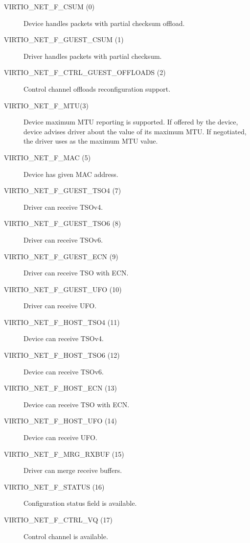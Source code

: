 \begin{description}
\item[VIRTIO_NET_F_CSUM (0)] Device handles packets with partial checksum offload.

\item[VIRTIO_NET_F_GUEST_CSUM (1)] Driver handles packets with partial checksum.

\item[VIRTIO_NET_F_CTRL_GUEST_OFFLOADS (2)] Control channel offloads
        reconfiguration support.

\item[VIRTIO_NET_F_MTU(3)] Device maximum MTU reporting is supported. If
    offered by the device, device advises driver about the value of
    its maximum MTU. If negotiated, the driver uses  as
    the maximum MTU value.

\item[VIRTIO_NET_F_MAC (5)] Device has given MAC address.

\item[VIRTIO_NET_F_GUEST_TSO4 (7)] Driver can receive TSOv4.

\item[VIRTIO_NET_F_GUEST_TSO6 (8)] Driver can receive TSOv6.

\item[VIRTIO_NET_F_GUEST_ECN (9)] Driver can receive TSO with ECN.

\item[VIRTIO_NET_F_GUEST_UFO (10)] Driver can receive UFO.

\item[VIRTIO_NET_F_HOST_TSO4 (11)] Device can receive TSOv4.

\item[VIRTIO_NET_F_HOST_TSO6 (12)] Device can receive TSOv6.

\item[VIRTIO_NET_F_HOST_ECN (13)] Device can receive TSO with ECN.

\item[VIRTIO_NET_F_HOST_UFO (14)] Device can receive UFO.

\item[VIRTIO_NET_F_MRG_RXBUF (15)] Driver can merge receive buffers.

\item[VIRTIO_NET_F_STATUS (16)] Configuration status field is
    available.

\item[VIRTIO_NET_F_CTRL_VQ (17)] Control channel is available.


\end{description}
